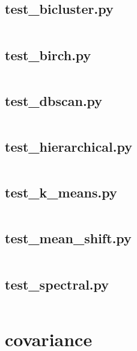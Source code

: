 \documentclass{article}
\begin{document}
\subsection{test\_bicluster.py}
\inputminted{python}{/home/dufferzafar/dev/@clones/scikit-learn/sklearn/cluster/tests/test_bicluster.py}
\newpage

\subsection{test\_birch.py}
\inputminted{python}{/home/dufferzafar/dev/@clones/scikit-learn/sklearn/cluster/tests/test_birch.py}
\newpage

\subsection{test\_dbscan.py}
\inputminted{python}{/home/dufferzafar/dev/@clones/scikit-learn/sklearn/cluster/tests/test_dbscan.py}
\newpage

\subsection{test\_hierarchical.py}
\inputminted{python}{/home/dufferzafar/dev/@clones/scikit-learn/sklearn/cluster/tests/test_hierarchical.py}
\newpage

\subsection{test\_k\_means.py}
\inputminted{python}{/home/dufferzafar/dev/@clones/scikit-learn/sklearn/cluster/tests/test_k_means.py}
\newpage

\subsection{test\_mean\_shift.py}
\inputminted{python}{/home/dufferzafar/dev/@clones/scikit-learn/sklearn/cluster/tests/test_mean_shift.py}
\newpage

\subsection{test\_spectral.py}
\inputminted{python}{/home/dufferzafar/dev/@clones/scikit-learn/sklearn/cluster/tests/test_spectral.py}
\newpage

\section{covariance}
\end{document}

